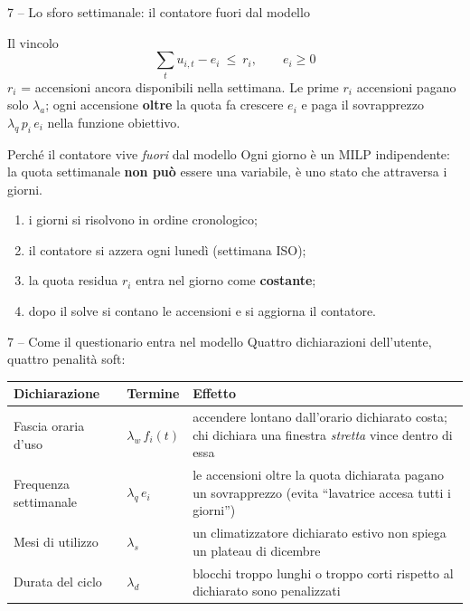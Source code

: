 \documentclass[aspectratio=169]{beamer}
\begin{document}
\begin{frame}{7 -- Lo sforo settimanale: il contatore fuori dal modello}
  \begin{block}{Il vincolo}
    \[
      \sum_{t} u_{i,t} - e_i \ \le\ r_i, \qquad e_i \ge 0
    \]
    \small
    $r_i$ = accensioni ancora disponibili nella settimana. Le prime $r_i$ accensioni pagano solo
    $\lambda_a$; ogni accensione \textbf{oltre} la quota fa crescere $e_i$ e paga il sovrapprezzo
    $\lambda_q\, p_i\, e_i$ nella funzione obiettivo.
  \end{block}

  \begin{exampleblock}{Perch\'e il contatore vive \emph{fuori} dal modello}
    \small
    Ogni giorno \`e un MILP indipendente: la quota settimanale \textbf{non pu\`o} essere una
    variabile, \`e uno stato che attraversa i giorni.
    \begin{enumerate}
      \item i giorni si risolvono in ordine cronologico;
      \item il contatore si azzera ogni luned\`i (settimana ISO);
      \item la quota residua $r_i$ entra nel giorno come \textbf{costante};
      \item dopo il solve si contano le accensioni e si aggiorna il contatore.
    \end{enumerate}
  \end{exampleblock}
\end{frame}

\begin{frame}{7 -- Come il questionario entra nel modello}
  Quattro dichiarazioni dell'utente, quattro penalit\`a soft:
  \vspace{0.2em}
  \begin{table}\small
    \renewcommand{\arraystretch}{1.3}
    \begin{tabularx}{\textwidth}{l l X}
      \toprule
      \textbf{Dichiarazione} & \textbf{Termine} & \textbf{Effetto} \\
      \midrule
      Fascia oraria d'uso & $\lambda_w\, f_i(t)$ &
        accendere lontano dall'orario dichiarato costa; chi dichiara una finestra
        \emph{stretta} vince dentro di essa \\
      Frequenza settimanale & $\lambda_q\, e_i$ &
        le accensioni oltre la quota dichiarata pagano un sovrapprezzo (evita
        ``lavatrice accesa tutti i giorni'') \\
      Mesi di utilizzo & $\lambda_s$ &
        un climatizzatore dichiarato estivo non spiega un plateau di dicembre \\
      Durata del ciclo & $\lambda_d$ &
        blocchi troppo lunghi o troppo corti rispetto al dichiarato sono penalizzati \\
      \bottomrule
    \end{tabularx}
  \end{table}

\end{frame}
\end{document}
